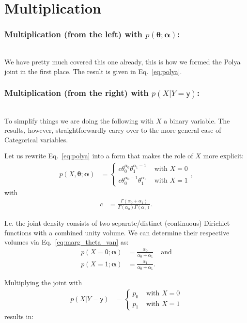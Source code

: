 \documentclass[oneside,english]{scrbook}
\begin{document}
\section{Multiplication} \label{sec:polya_mpy}
\subsubsection{Multiplication (from the left) with $p(\bm{\theta};\bm{\alpha})$:}~\\
We have pretty much covered this one already, this is how we formed
the Polya joint in the first place. The result is given in
Eq.~\ref{eq:polya}.

\subsubsection{Multiplication (from the right) with $p(X|Y=\mathsf{y})$:}~\\
To simplify things we are doing the following with $X$ a binary
variable. The results, however, straightforwardly carry over to the
more general case of Categorical variables.

Let us rewrite Eq.~\ref{eq:polya} into a form that makes the role of
$X$ more explicit:
\begin{align*}
  p(X,\bm{\theta};\bm{\alpha}) &= \left\{
    \begin{array}{lr}
    c\theta_0^{\alpha_0}\theta_1^{\alpha_1-1} & \mbox{ with } X=0\\
    c\theta_0^{\alpha_0-1}\theta_1^{\alpha_1} & \mbox{ with } X=1
\end{array}
\right.,
\end{align*}
with
\begin{align*}
  c &= \frac{\Gamma(\alpha_0+\alpha_1)}{\Gamma(\alpha_0)\Gamma(\alpha_1)}.
\end{align*}

I.e. the joint density consists of two separate/distinct (continuous)
Dirichlet functions with a combined unity volume. We can determine
their respective volumes via Eq.~\ref{eq:marg_theta_van} as:
\begin{align*}
  p(X=\mathsf{0};\bm{\alpha}) &= \frac{\alpha_0}{\alpha_0+\alpha_1} & \text{and}\\
  p(X=\mathsf{1};\bm{\alpha}) &= \frac{\alpha_1}{\alpha_0+\alpha_1}.
\end{align*}

Multiplying the joint with
\begin{align*}
  p(X|Y=\mathsf{y}) &= \left\{
    \begin{array}{lr}
    p_0 & \mbox{ with } X=0\\
    p_1 & \mbox{ with } X=1
\end{array}
\right.
\end{align*}
results in:
\end{document}
